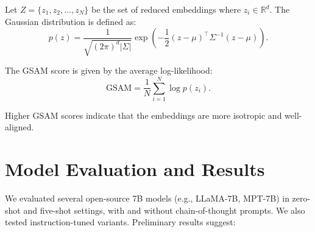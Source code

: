 \documentclass[11pt,letterpaper]{article}
\begin{document}
Let $Z = \{z_1, z_2, \ldots, z_N\}$ be the set of reduced embeddings where $z_i \in \mathbb{R}^d$. The Gaussian distribution is defined as:
\[
p(z) = \frac{1}{\sqrt{(2\pi)^d|\Sigma|}} \exp\left(-\frac{1}{2}(z - \mu)^\top \Sigma^{-1}(z - \mu)\right).
\]

The GSAM score is given by the average log-likelihood:
\[
\text{GSAM} = \frac{1}{N}\sum_{i=1}^N \log p(z_i).
\]

Higher GSAM scores indicate that the embeddings are more isotropic and well-aligned.

\section{Model Evaluation and Results}

We evaluated several open-source 7B models (e.g., LLaMA-7B, MPT-7B) in zero-shot and five-shot settings, with and without chain-of-thought prompts. We also tested instruction-tuned variants. Preliminary results suggest:
\end{document}
